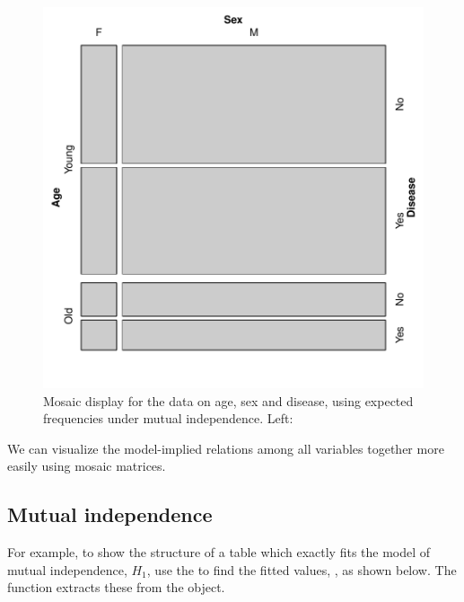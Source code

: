\documentclass[11pt]{book}
\renewenvironment{knitrout}{\small\renewcommand{\baselinestretch}{.85}}{} %
\begin{document}
\begin{knitrout}
\color{fgcolor}\begin{kframe}
\begin{alltt}
 \hlstd{=}\hlstd{)}
\end{alltt}
\end{kframe}\begin{figure}[!htbp]


\centerline{\includegraphics[width=.6\textwidth]{ch05/fig/struc-mos2} }

\caption[Mosaic display for the data on age, sex and disease, using expected frequencies under mutual independence]{Mosaic display for the data on age, sex and disease, using expected frequencies under mutual independence. Left: \label{fig:struc-mos2}}
\end{figure}


\end{knitrout}
We can visualize the model-implied relations among all variables together more easily
using mosaic matrices.

\subsection{Mutual independence}
For example, to show the structure of a table which exactly fits the model of
mutual independence, $H_1$, use the  to find the
fitted values, , as shown below.  The
function  extracts these from the  object.
\end{document}
